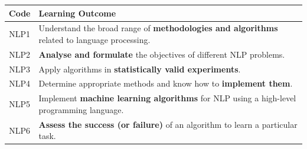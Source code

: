 \begin{center}
\renewcommand{\arraystretch}{1.4}
\begin{tabular}{@{} c p{12cm} @{}}
\toprule
\textbf{Code} & \textbf{Learning Outcome} \\
\midrule
NLP1 & Understand the broad range of \textbf{methodologies and algorithms} related to language processing. \\
NLP2 & \textbf{Analyse and formulate} the objectives of different NLP problems. \\
NLP3 & Apply algorithms in \textbf{statistically valid experiments}. \\
NLP4 & Determine appropriate methods and know how to \textbf{implement them}. \\
NLP5 & Implement \textbf{machine learning algorithms} for NLP using a high-level programming language. \\
NLP6 & \textbf{Assess the success (or failure)} of an algorithm to learn a particular task. \\
\bottomrule
\end{tabular}
\end{center}

\bigseparator

